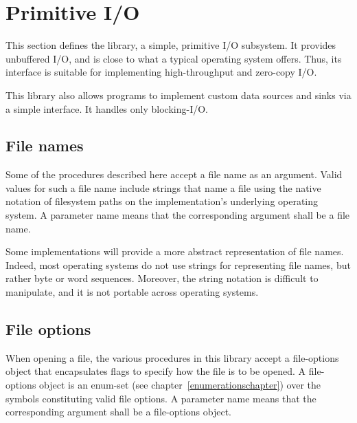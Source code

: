 \section{Primitive I/O}
\label{primiosection}

This section defines the  library, a
simple, primitive I/O subsystem.  It provides unbuffered I/O, and is
close to what a typical operating system offers. Thus, its interface
is suitable for implementing high-throughput and zero-copy I/O.

This library also allows programs to implement custom data
sources and sinks via a simple interface.
It handles only blocking-I/O.

\subsection{File names}

Some of the procedures described here accept a file name as an
argument. Valid values for such a file name include strings that name a file
using the native notation of filesystem paths on the implementation's underlying
operating system.
A  parameter name means that the
corresponding argument shall be a file name.

Some implementations will provide a more
abstract representation of file names. Indeed, most operating
systems do not use strings for representing file names, but rather byte
or word sequences. Moreover, the string notation is difficult to manipulate, and
it is not portable across operating systems.

\subsection{File options}
\label{fileoptionssection}

When opening a file, the various procedures in this library accept a
{\cf file-options} object that encapsulates flags to specify how
the file is to be opened. A {\cf file-options} object is an enum-set
(see chapter~\ref{enumerationschapter}) over the symbols constituting
valid file options.
A  parameter name means that the
corresponding argument shall be a file-options object.

